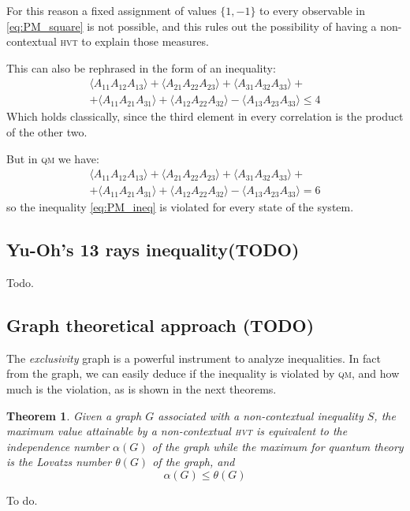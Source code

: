 \documentclass[a4paper]{article}
\newcommand{\acron}[1]{\textsc{#1}}
\newcommand{\HVT}{\acron{hvt}}
\newcommand{\QM}{\acron{qm}}
\newtheorem{theorem}{Theorem}[section]
\theoremstyle{definition}
\let\oldproof\proof
\let\oldendproof\endproof
\renewenvironment{proof}
    {
        \begin{framed} 
        \oldproof
    }
    {
        \oldendproof 
        \end{framed}
    }
\begin{document}
For this reason a fixed assignment of values $\{1,-1\}$ to every observable in
\eqref{eq:PM_square} is not possible, and this rules out the possibility of
having a non-contextual \HVT{} to explain those measures.

This can also be rephrased in the form of an inequality:
\begin{multline}
    \langle{A_{11}A_{12}A_{13}}\rangle + 
    \langle{A_{21}A_{22}A_{23}}\rangle + 
    \langle{A_{31}A_{32}A_{33}}\rangle +\\ +
    \langle{A_{11}A_{21}A_{31}}\rangle + 
    \langle{A_{12}A_{22}A_{32}}\rangle - 
    \langle{A_{13}A_{23}A_{33}}\rangle \le 4 
    \label{eq:PM_ineq}
\end{multline}
Which holds classically, since the third element in every correlation is the
product of the other two.

But in \QM{} we have:
\begin{multline}
    \langle{A_{11}A_{12}A_{13}}\rangle + 
    \langle{A_{21}A_{22}A_{23}}\rangle + 
    \langle{A_{31}A_{32}A_{33}}\rangle +\\ +
    \langle{A_{11}A_{21}A_{31}}\rangle + 
    \langle{A_{12}A_{22}A_{32}}\rangle - 
    \langle{A_{13}A_{23}A_{33}}\rangle = 6 
\end{multline}
so the inequality \eqref{eq:PM_ineq} is violated for every state of the system.

\subsection{Yu-Oh's 13 rays inequality(TODO)}
Todo.
\label{sec:YO13}

\subsection{Graph theoretical approach (TODO)}
The \emph{exclusivity} graph is a powerful instrument to
analyze inequalities.
In fact from the graph, we can easily deduce if the inequality is
violated by \QM{}, and how much is the violation, as is shown in the next theorems.

\begin{theorem}
    Given a graph $G$ associated with a non-contextual inequality $S$, the maximum value
    attainable by a non-contextual \HVT{} is equivalent to the independence number
    $\alpha(G)$ of the graph while the maximum for quantum theory is the Lovatzs number
    $\theta(G)$ of the graph, and
    \begin{equation}
        \alpha(G) \le \theta(G)
    \end{equation}
    \label{th:nc_graph_indilov}
\end{theorem}
\begin{proof}
    To do.
\end{proof}
\end{document}
